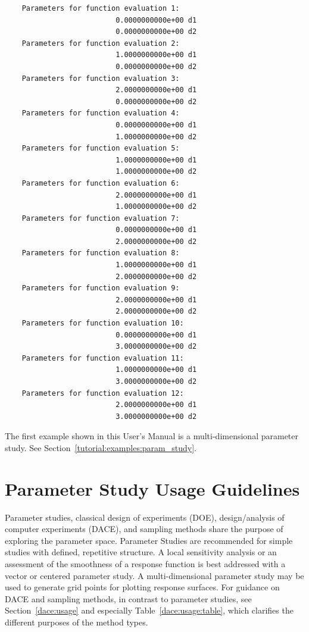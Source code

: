\begin{small}
\begin{verbatim}
    Parameters for function evaluation 1:
                          0.0000000000e+00 d1   
                          0.0000000000e+00 d2   
    Parameters for function evaluation 2:
                          1.0000000000e+00 d1   
                          0.0000000000e+00 d2   
    Parameters for function evaluation 3:
                          2.0000000000e+00 d1   
                          0.0000000000e+00 d2   
    Parameters for function evaluation 4:
                          0.0000000000e+00 d1   
                          1.0000000000e+00 d2   
    Parameters for function evaluation 5:
                          1.0000000000e+00 d1   
                          1.0000000000e+00 d2   
    Parameters for function evaluation 6:
                          2.0000000000e+00 d1   
                          1.0000000000e+00 d2   
    Parameters for function evaluation 7:
                          0.0000000000e+00 d1   
                          2.0000000000e+00 d2   
    Parameters for function evaluation 8:
                          1.0000000000e+00 d1   
                          2.0000000000e+00 d2   
    Parameters for function evaluation 9:
                          2.0000000000e+00 d1   
                          2.0000000000e+00 d2   
    Parameters for function evaluation 10:
                          0.0000000000e+00 d1   
                          3.0000000000e+00 d2   
    Parameters for function evaluation 11:
                          1.0000000000e+00 d1   
                          3.0000000000e+00 d2   
    Parameters for function evaluation 12:
                          2.0000000000e+00 d1   
                          3.0000000000e+00 d2
\end{verbatim}
\end{small}

The first example shown in this User's Manual is a multi-dimensional
parameter study. See Section~\ref{tutorial:examples:param_study}.

\section{Parameter Study Usage Guidelines}\label{ps:usage}

Parameter studies, classical design of experiments (DOE),
design/analysis of computer experiments (DACE), and sampling methods
share the purpose of exploring the parameter space.  Parameter Studies
are recommended for simple studies with defined, repetitive structure.
A local sensitivity analysis or an assessment of the
smoothness of a response function is best addressed with a vector or
centered parameter study. A multi-dimensional parameter 
study may be used to generate grid points for plotting response surfaces.
For guidance on DACE and sampling methods, in contrast to parameter 
studies, see Section~\ref{dace:usage} and especially Table~\ref{dace:usage:table},
which clarifies the different purposes of the method types.
 
